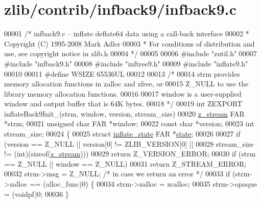 \hypertarget{zlib_2contrib_2infback9_2infback9_8c_source}{}\section{zlib/contrib/infback9/infback9.c}
\label{zlib_2contrib_2infback9_2infback9_8c_source}

\begin{DoxyCode}
00001 \textcolor{comment}{/* infback9.c -- inflate deflate64 data using a call-back interface}
00002 \textcolor{comment}{ * Copyright (C) 1995-2008 Mark Adler}
00003 \textcolor{comment}{ * For conditions of distribution and use, see copyright notice in zlib.h}
00004 \textcolor{comment}{ */}
00005 
00006 \textcolor{preprocessor}{#include "zutil.h"}
00007 \textcolor{preprocessor}{#include "infback9.h"}
00008 \textcolor{preprocessor}{#include "inftree9.h"}
00009 \textcolor{preprocessor}{#include "inflate9.h"}
00010 
00011 \textcolor{preprocessor}{#define WSIZE 65536UL}
00012 
00013 \textcolor{comment}{/*}
00014 \textcolor{comment}{   strm provides memory allocation functions in zalloc and zfree, or}
00015 \textcolor{comment}{   Z\_NULL to use the library memory allocation functions.}
00016 \textcolor{comment}{}
00017 \textcolor{comment}{   window is a user-supplied window and output buffer that is 64K bytes.}
00018 \textcolor{comment}{ */}
00019 \textcolor{keywordtype}{int} ZEXPORT inflateBack9Init\_(strm, window, version, stream\_size)
00020 \hyperlink{structz__stream__s}{z\_stream} FAR *strm;
00021 \textcolor{keywordtype}{unsigned} \textcolor{keywordtype}{char} FAR *window;
00022 \textcolor{keyword}{const} \textcolor{keywordtype}{char} *version;
00023 \textcolor{keywordtype}{int} stream\_size;
00024 \{
00025     \textcolor{keyword}{struct }\hyperlink{structinflate__state}{inflate\_state} FAR *\hyperlink{structstate}{state};
00026 
00027     \textcolor{keywordflow}{if} (version == Z\_NULL || version[0] != ZLIB\_VERSION[0] ||
00028         stream\_size != (\textcolor{keywordtype}{int})(\textcolor{keyword}{sizeof}(\hyperlink{structz__stream__s}{z\_stream})))
00029         \textcolor{keywordflow}{return} Z\_VERSION\_ERROR;
00030     \textcolor{keywordflow}{if} (strm == Z\_NULL || window == Z\_NULL)
00031         \textcolor{keywordflow}{return} Z\_STREAM\_ERROR;
00032     strm->msg = Z\_NULL;                 \textcolor{comment}{/* in case we return an error */}
00033     \textcolor{keywordflow}{if} (strm->zalloc == (alloc\_func)0) \{
00034         strm->zalloc = zcalloc;
00035         strm->opaque = (voidpf)0;
00036     \}

\end{DoxyCode}
